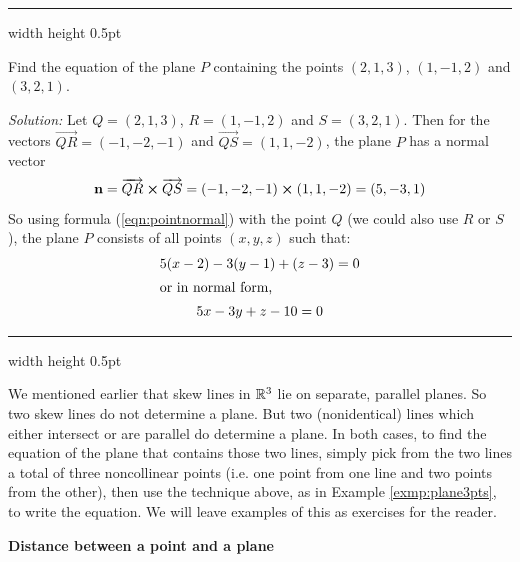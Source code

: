 \hrule width \textwidth height 0.5pt
\begin{exmp}\label{exmp:plane3pts}
 Find the equation of the plane $P$ containing the points $(2,1,3)$, $(1,-1,2)$ and $(3,2,1)$.\vspace{1mm}
 \par\noindent\emph{Solution:} Let $Q = (2,1,3)$, $R = (1,-1,2)$ and $S = (3,2,1)$. Then for the vectors
 $\overrightarrow{QR} = (-1,-2,-1)$ and $\overrightarrow{QS} = (1,1,-2)$, the plane $P$ has a normal vector
 \begin{displaymath}
  \textbf{n} = \overrightarrow{QR} \bm{\times} \overrightarrow{QS} = (-1,-2,-1) \bm{\times} (1,1,-2) = (5,-3,1)
 \end{displaymath}
 So using formula (\ref{eqn:pointnormal}) with the point $Q$ (we could also use $R$ or $S$), the plane $P$ consists of
 all points $(x,y,z)$ such that:
 \begin{gather*}
  5(x - 2) - 3(y - 1) + (z - 3) = 0\\
  \intertext{or in normal form,}
  5x - 3y + z - 10 = 0
 \end{gather*}
\end{exmp}
\hrule width \textwidth height 0.5pt
\vspace{2mm}

We mentioned earlier that skew lines in $\mathbb{R}^{3}$ lie on separate, parallel planes. So two skew lines do not determine
a plane. But two (nonidentical) lines which either intersect or are parallel do determine a plane. In both cases, to
find the equation of the plane that contains those two lines, simply pick from the two lines a total of three
noncollinear points (i.e. one point from one line and two points from the other), then use the technique above, as in
Example \ref{exmp:plane3pts}, to write the equation. We will leave examples of this as exercises for the reader.
\newpage
\par\noindent\textbf{\large{Distance between a point and a plane}}\normalsize\vspace{1.5mm}

